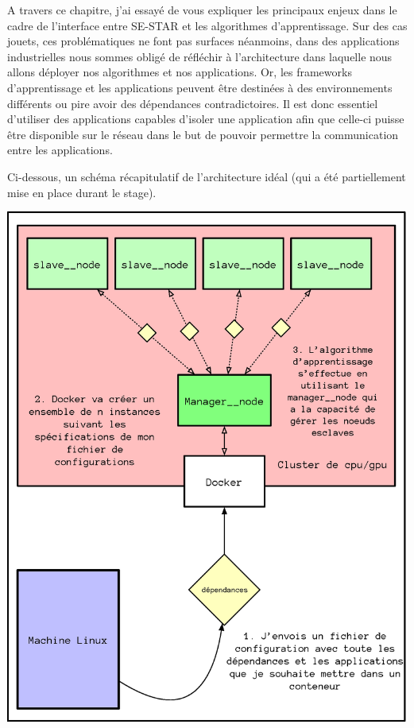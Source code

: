 A travers ce chapitre, j'ai essayé de vous expliquer les principaux enjeux dans le cadre de l'interface entre SE-STAR et les algorithmes d'apprentissage. Sur des cas jouets, ces problématiques ne font pas surfaces néanmoins, dans des applications industrielles nous sommes obligé de réfléchir à l'architecture dans laquelle nous allons déployer nos algorithmes et nos applications. Or, les \gls{frameworks} d'apprentissage et les applications peuvent être destinées à des environnements différents ou pire avoir des dépendances contradictoires. Il est donc essentiel  d'utiliser des applications capables d'isoler une application afin que celle-ci puisse être  disponible sur le réseau dans le but de pouvoir permettre la communication entre les applications.

Ci-dessous, un schéma récapitulatif de l'architecture idéal (qui a été partiellement mise en place durant le stage).


\begin{center}
\includegraphics[scale=.7]{./assets/interfaceReseau/interfaceResume.eps}
\end{center}

